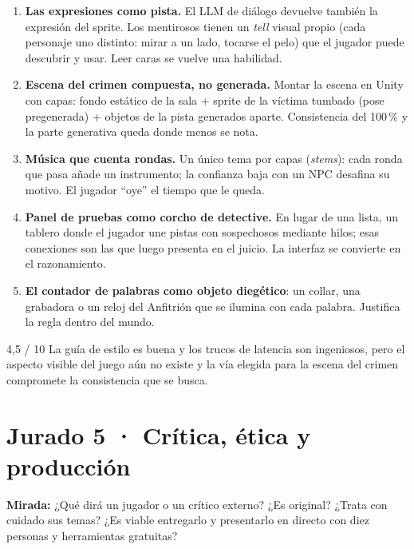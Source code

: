 \documentclass[11pt,a4paper]{article}
\begin{document}
\begin{inedito}
\begin{enumerate}
\item \textbf{Las expresiones como pista.} El LLM de diálogo devuelve también la expresión del
sprite. Los mentirosos tienen un \emph{tell} visual propio (cada personaje uno distinto: mirar a un
lado, tocarse el pelo) que el jugador puede descubrir y usar. Leer caras se vuelve una habilidad.
\item \textbf{Escena del crimen compuesta, no generada.} Montar la escena en Unity con capas: fondo
estático de la sala + sprite de la víctima tumbado (pose pregenerada) + objetos de la pista
generados aparte. Consistencia del 100\,\% y la parte generativa queda donde menos se nota.
\item \textbf{Música que cuenta rondas.} Un único tema por capas (\emph{stems}): cada ronda que
pasa añade un instrumento; la confianza baja con un NPC desafina su motivo. El jugador ``oye'' el
tiempo que le queda.
\item \textbf{Panel de pruebas como corcho de detective.} En lugar de una lista, un tablero donde el
jugador une pistas con sospechosos mediante hilos; esas conexiones son las que luego presenta en el
juicio. La interfaz se convierte en el razonamiento.
\item \textbf{El contador de palabras como objeto diegético}: un collar, una grabadora o un reloj
del Anfitrión que se ilumina con cada palabra. Justifica la regla dentro del mundo.
\end{enumerate}
\end{inedito}

\begin{veredicto}{4,5 / 10}
La guía de estilo es buena y los trucos de latencia son ingeniosos, pero el aspecto visible del juego
aún no existe y la vía elegida para la escena del crimen compromete la consistencia que se busca.
\end{veredicto}

\section{Jurado 5 · Crítica, ética y producción}

\begin{perfil}
\textbf{Mirada:} ¿Qué dirá un jugador o un crítico externo? ¿Es original? ¿Trata con cuidado sus
temas? ¿Es viable entregarlo y presentarlo en directo con diez personas y herramientas gratuitas?
\end{perfil}
\end{document}
